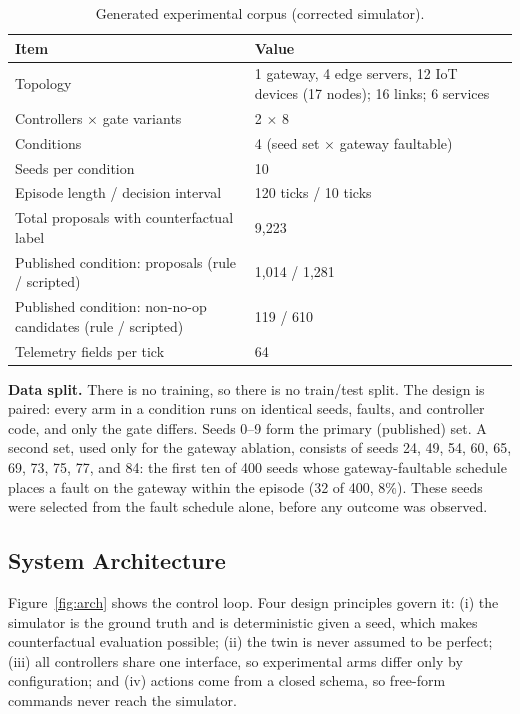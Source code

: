 \documentclass[conference]{IEEEtran}
\begin{document}
\begin{table}[t]
\centering
\caption{Generated experimental corpus (corrected simulator).}
\label{tab:dataset}
\footnotesize
\begin{tabular}{@{}p{}p{}@{}}
\toprule
Item & Value \\
\midrule
Topology & 1 gateway, 4 edge servers, 12 IoT devices (17 nodes); 16 links; 6 services \\
Controllers $\times$ gate variants & 2 $\times$ 8 \\
Conditions & 4 (seed set $\times$ gateway faultable) \\
Seeds per condition & 10 \\
Episode length / decision interval & 120 ticks / 10 ticks \\
Total proposals with counterfactual label & 9,223 \\
Published condition: proposals (rule / scripted) & 1,014 / 1,281 \\
Published condition: non-no-op candidates (rule / scripted) & 119 / 610 \\
Telemetry fields per tick & 64 \\
\bottomrule
\end{tabular}
\end{table}

\textbf{Data split.} There is no training, so there is no train/test split. The design is paired: every arm in a condition runs on identical seeds, faults, and controller code, and only the gate differs. Seeds 0--9 form the primary (published) set. A second set, used only for the gateway ablation, consists of seeds 24, 49, 54, 60, 65, 69, 73, 75, 77, and 84: the first ten of 400 seeds whose gateway-faultable schedule places a fault on the gateway within the episode (32 of 400, 8\%). These seeds were selected from the fault schedule alone, before any outcome was observed.

\subsection{System Architecture}

Figure~\ref{fig:arch} shows the control loop. Four design principles govern it: (i) the simulator is the ground truth and is deterministic given a seed, which makes counterfactual evaluation possible; (ii) the twin is never assumed to be perfect; (iii) all controllers share one interface, so experimental arms differ only by configuration; and (iv) actions come from a closed schema, so free-form commands never reach the simulator.
\end{document}
